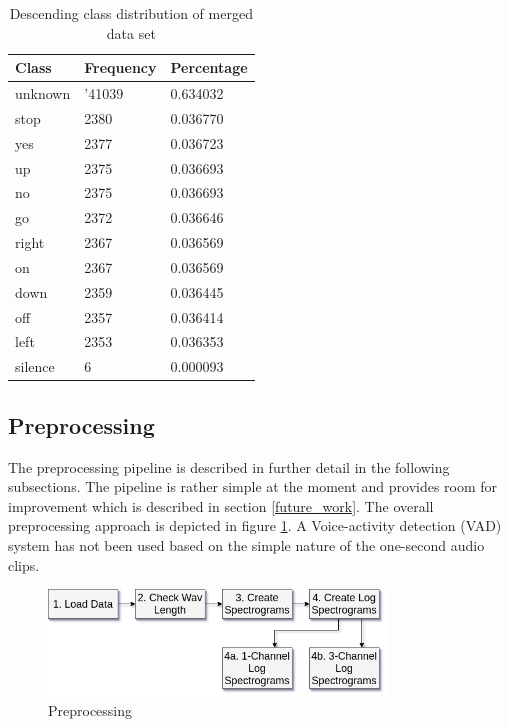 \documentclass{article}
\theoremstyle{definition}
\theoremstyle{remark}
\begin{document}
\begin{table}[h!]
\center
\begin{tabular}{|l|l|l|}
\hline
Class & Frequency & Percentage \\ \hline
unknown & '41039 & 0.634032  \\ \hline
stop & 2380 & 0.036770 \\ \hline
yes & 2377 & 0.036723  \\ \hline
up & 2375 &  0.036693\\ \hline
no & 2375 & 0.036693 \\ \hline
go & 2372 & 0.036646 \\ \hline
right & 2367 & 0.036569 \\ \hline
on & 2367 & 0.036569 \\ \hline
down & 2359 & 0.036445 \\ \hline
off & 2357 & 0.036414 \\ \hline
left & 2353 & 0.036353\\ \hline
silence & 6 & 0.000093\\ \hline
\end{tabular}
\caption{Descending class distribution of merged data set}
\label{tab:class_distribution}
\end{table}

		
		
		
		
		
		
		
		
		
		
		

\subsection{Preprocessing}

The preprocessing pipeline is described in further detail in the following subsections. The pipeline is rather simple at the moment and provides room for improvement which is described in section \ref{future_work}. The overall preprocessing approach is depicted in figure \ref{fig:preprocessing}. A Voice-activity detection (VAD) system 
has not been used based on the simple nature of the one-second audio clips.

\begin{figure}[h]
    \centering
    \includegraphics[width=0.8\textwidth]{img/preprocessing.png}
    \caption{Preprocessing}
    \label{fig:preprocessing}
\end{figure}
\end{document}
